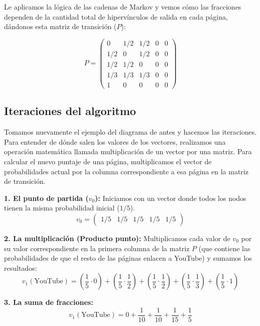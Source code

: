 Le aplicamos la lógica de las cadenas de Markov y vemos cómo las fracciones dependen de la cantidad total de hipervínculos de salida en cada página, dándonos esta matriz de transición ($P$):

\begin{equation}
    P = \begin{pmatrix}
    0 & 1/2 & 1/2 & 0 & 0 \\
    1/2 & 0 & 1/2 & 0 & 0 \\
    1/2 & 1/2 & 0 & 0 & 0 \\
    1/3 & 1/3 & 1/3 & 0 & 0 \\
    1 & 0 & 0 & 0 & 0
    \end{pmatrix}
\end{equation}

\subsection{Iteraciones del algoritmo}
Tomamos nuevamente el ejemplo del diagrama de antes y hacemos las iteraciones. Para entender de dónde salen los valores de los vectores, realizamos una operación matemática llamada multiplicación de un vector por una matriz. Para calcular el nuevo puntaje de una página, multiplicamos el vector de probabilidades actual por la columna correspondiente a esa página en la matriz de transición.

\textbf{1. El punto de partida ($v_0$):}
Iniciamos con un vector donde todos los nodos tienen la misma probabilidad inicial ($1/5$).
\begin{equation}
    v_0 = \begin{pmatrix} 1/5 & 1/5 & 1/5 & 1/5 & 1/5 \end{pmatrix}
\end{equation}

\textbf{2. La multiplicación (Producto punto):}
Multiplicamos cada valor de $v_0$ por su valor correspondiente en la primera columna de la matriz $P$ (que contiene las probabilidades de que el resto de las páginas enlacen a YouTube) y sumamos los resultados:
\begin{equation}
    v_1(\text{YouTube}) = \left(\frac{1}{5} \cdot 0\right) + \left(\frac{1}{5} \cdot \frac{1}{2}\right) + \left(\frac{1}{5} \cdot \frac{1}{2}\right) + \left(\frac{1}{5} \cdot \frac{1}{3}\right) + \left(\frac{1}{5} \cdot 1\right)
\end{equation}

\textbf{3. La suma de fracciones:}
\begin{equation}
    v_1(\text{YouTube}) = 0 + \frac{1}{10} + \frac{1}{10} + \frac{1}{15} + \frac{1}{5}
\end{equation}


